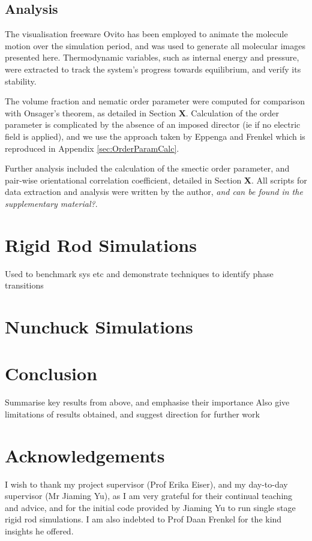 \documentclass[11pt, a4paper]{article} %
\begin{document}
 
\subsection{Analysis}

The visualisation freeware Ovito \cite{Ovito} has been employed to animate the molecule motion over the simulation period, and was used to generate all molecular images presented here. Thermodynamic variables, such as internal energy and pressure, were extracted to track the system's progress towards equilibrium, and verify its stability.

The volume fraction and nematic order parameter were computed for comparison with Onsager's theorem, as detailed in Section \textbf{X}. Calculation of the order parameter is complicated by the absence of an imposed director (ie if no electric field is applied), and we use the approach taken by Eppenga and Frenkel \cite{Eppenga1984} which is reproduced in Appendix \ref{sec:OrderParamCalc}. %

Further analysis included the calculation of the smectic order parameter, and pair-wise orientational correlation coefficient, detailed in Section \textbf{X}. All scripts for data extraction and analysis were written by the author, \textit{and can be found in the supplementary material?}.



\section{Rigid Rod Simulations}
Used to benchmark sys etc and demonstrate techniques to identify phase transitions

\section{Nunchuck Simulations}



\section{Conclusion}
Summarise key results from above, and emphasise their importance 
Also give limitations of results obtained, and suggest direction for further work

\section*{Acknowledgements}
I wish to thank my project supervisor (Prof Erika Eiser), and my day-to-day supervisor (Mr Jiaming Yu), as I am very grateful for their continual teaching and advice, and for the initial code provided by Jiaming Yu to run single stage rigid rod simulations. I am also indebted to Prof Daan Frenkel for the kind insights he offered.
\end{document}
